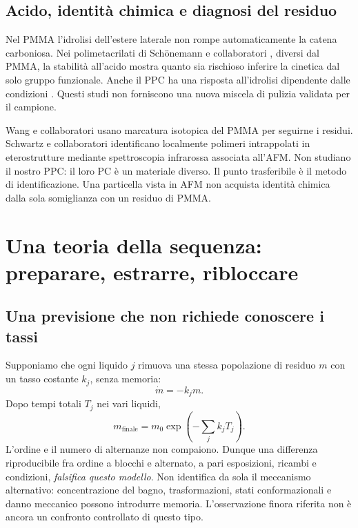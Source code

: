 \documentclass[11pt,reqno]{amsart}
\numberwithin{equation}{section}
\begin{document}
\subsection{Acido, identit\`a chimica e diagnosi del residuo}
Nel PMMA l'idrolisi dell'estere laterale non rompe automaticamente
la catena carboniosa. Nei polimetacrilati di Sch\"onemann e
collaboratori \cite{Schoenemann2018}, diversi dal PMMA, la stabilit\`a
all'acido mostra quanto sia rischioso inferire la cinetica dal solo
gruppo funzionale. Anche il PPC ha una risposta all'idrolisi
dipendente dalle condizioni \cite{Jung2006}. Questi studi non
forniscono una nuova miscela di pulizia validata per il campione.

Wang e collaboratori \cite{Wang2017} usano marcatura isotopica del
PMMA per seguirne i residui. Schwartz e collaboratori
\cite{Schwartz2019} identificano localmente polimeri intrappolati
in eterostrutture mediante spettroscopia infrarossa associata
all'AFM. Non studiano il nostro PPC: il loro PC \`e un materiale
diverso. Il punto trasferibile \`e il metodo di identificazione.
Una particella vista in AFM non acquista identit\`a chimica dalla
sola somiglianza con un residuo di PMMA.

\section{Una teoria della sequenza: preparare, estrarre, ribloccare}
\label{sec:states}

\subsection{Una previsione che non richiede conoscere i tassi}
Supponiamo che ogni liquido $j$ rimuova una stessa popolazione di
residuo $m$ con un tasso costante $k_j$, senza memoria:
\begin{equation}\label{eq:scalar}
 \dot m=-k_jm.
\end{equation}
Dopo tempi totali $T_j$ nei vari liquidi,
\begin{equation}\label{eq:orderindependent}
 m_{\mathrm{finale}}=m_0\exp\!\left(-\sum_j k_jT_j\right).
\end{equation}
L'ordine e il numero di alternanze non compaiono. Dunque una
differenza riproducibile fra ordine a blocchi e alternato, a pari
esposizioni, ricambi e condizioni, \emph{falsifica questo modello}.
Non identifica da sola il meccanismo alternativo: concentrazione
del bagno, trasformazioni, stati conformazionali e danno meccanico
possono introdurre memoria. L'osservazione finora riferita non \`e
ancora un confronto controllato di questo tipo.
\end{document}
